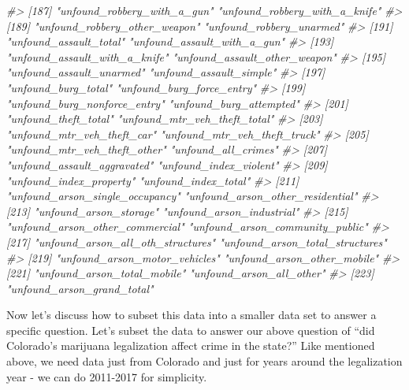 \documentclass[
]{krantz}
\makeatletter
\newenvironment{Shaded}{\begin{snugshade}}{\end{snugshade}}
\newcommand{\CommentTok}[1]{\textcolor[rgb]{0.37,0.37,0.37}{\textit{#1}}}
\newenvironment{kframe}{%
\medskip{}
\setlength{\fboxsep}{.8em}
 \def\at@end@of@kframe{}%
 \ifinner\ifhmode%
  \def\at@end@of@kframe{\end{minipage}}%
  \begin{minipage}{\columnwidth}%
 \fi\fi%
 \def\FrameCommand##1{\hskip\@totalleftmargin \hskip-\fboxsep
 \colorbox{shadecolor}{##1}\hskip-\fboxsep
     \hskip-\linewidth \hskip-\@totalleftmargin \hskip\columnwidth}%
 \MakeFramed {\advance\hsize-\width
   \@totalleftmargin\z@ \linewidth\hsize
   \@setminipage}}%
 {\par\unskip\endMakeFramed%
 \at@end@of@kframe}
\renewenvironment{Shaded}{\begin{kframe}}{\end{kframe}}
\makeatother
\begin{document}
\begin{Shaded}
\begin{Highlighting}[]
\CommentTok{\#\textgreater{} [187] "unfound\_robbery\_with\_a\_gun"       "unfound\_robbery\_with\_a\_knife"    }
\CommentTok{\#\textgreater{} [189] "unfound\_robbery\_other\_weapon"     "unfound\_robbery\_unarmed"         }
\CommentTok{\#\textgreater{} [191] "unfound\_assault\_total"            "unfound\_assault\_with\_a\_gun"      }
\CommentTok{\#\textgreater{} [193] "unfound\_assault\_with\_a\_knife"     "unfound\_assault\_other\_weapon"    }
\CommentTok{\#\textgreater{} [195] "unfound\_assault\_unarmed"          "unfound\_assault\_simple"          }
\CommentTok{\#\textgreater{} [197] "unfound\_burg\_total"               "unfound\_burg\_force\_entry"        }
\CommentTok{\#\textgreater{} [199] "unfound\_burg\_nonforce\_entry"      "unfound\_burg\_attempted"          }
\CommentTok{\#\textgreater{} [201] "unfound\_theft\_total"              "unfound\_mtr\_veh\_theft\_total"     }
\CommentTok{\#\textgreater{} [203] "unfound\_mtr\_veh\_theft\_car"        "unfound\_mtr\_veh\_theft\_truck"     }
\CommentTok{\#\textgreater{} [205] "unfound\_mtr\_veh\_theft\_other"      "unfound\_all\_crimes"              }
\CommentTok{\#\textgreater{} [207] "unfound\_assault\_aggravated"       "unfound\_index\_violent"           }
\CommentTok{\#\textgreater{} [209] "unfound\_index\_property"           "unfound\_index\_total"             }
\CommentTok{\#\textgreater{} [211] "unfound\_arson\_single\_occupancy"   "unfound\_arson\_other\_residential" }
\CommentTok{\#\textgreater{} [213] "unfound\_arson\_storage"            "unfound\_arson\_industrial"        }
\CommentTok{\#\textgreater{} [215] "unfound\_arson\_other\_commercial"   "unfound\_arson\_community\_public"  }
\CommentTok{\#\textgreater{} [217] "unfound\_arson\_all\_oth\_structures" "unfound\_arson\_total\_structures"  }
\CommentTok{\#\textgreater{} [219] "unfound\_arson\_motor\_vehicles"     "unfound\_arson\_other\_mobile"      }
\CommentTok{\#\textgreater{} [221] "unfound\_arson\_total\_mobile"       "unfound\_arson\_all\_other"         }
\CommentTok{\#\textgreater{} [223] "unfound\_arson\_grand\_total"}
\end{Highlighting}
\end{Shaded}

Now let's discuss how to subset this data into a smaller data set to answer a specific question. Let's subset the data to answer our above question of ``did Colorado's marijuana legalization affect crime in the state?'' Like mentioned above, we need data just from Colorado and just for years around the legalization year - we can do 2011-2017 for simplicity.
\end{document}
